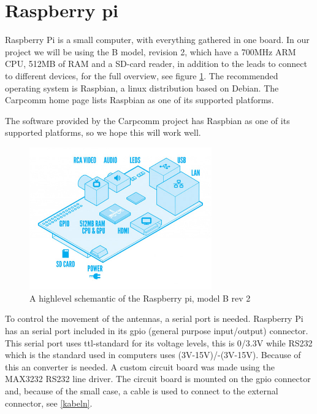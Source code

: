 \section{Raspberry pi}
Raspberry Pi is a small computer, with everything gathered in one board. In our project we will be using the B model, revision 2, which have a 700MHz ARM CPU, 512MB of RAM and a SD-card reader, in addition to the leads to connect to different devices, for  the full overview, see figure \ref{fig:raspberrypihighlevel}. The recommended operating system is Raspbian, a linux distribution based on Debian. The Carpcomm home page lists Raspbian as one of its supported platforms.

The software provided by the Carpcomm project has Raspbian as one of its supported platforms, so we hope this will work well.

\begin{figure}
	\begin{center}
		\includegraphics[width=0.7\textwidth]{Figures/raspberrypi_modelb_hl.jpg}
	\end{center}
	\caption[Raspberry pi highlevel]{A highlevel schemantic of the Raspberry pi, model B rev 2}
	\label{fig:raspberrypihighlevel}
\end{figure}

To control the movement of the antennas, a serial port is needed. Raspberry Pi has an serial port included in its gpio (general purpose input/output) connector. This serial port uses ttl-standard for its voltage levels, this is 0/3.3V while RS232 which is the standard used in computers uses (3V-15V)/-(3V-15V). Because of this an converter is needed. A custom circuit board was made using the MAX3232 RS232 line driver.%
The circuit board is mounted on the gpio connector and, because of the small case, a cable is used to connect to the external connector, see \autoref{kabeln}.

